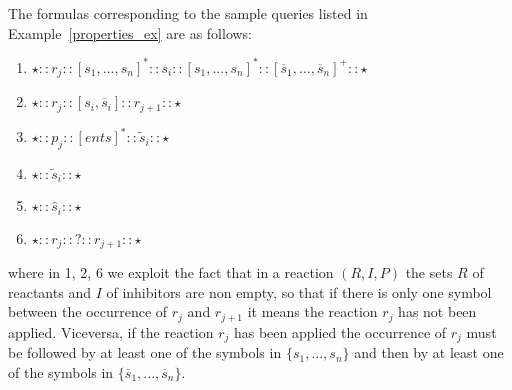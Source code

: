 
The formulas corresponding to the sample queries listed in Example~\ref{properties_ex} are as follows:

\begin{enumerate}
\item
$\star :: r_j :: [ s_1,...,s_n ]^* :: s_i :: [  s_1,...,s_n ]^* :: [  \overline{s}_1,...,\overline{s}_n ]^+ :: \star$
\item
$\star :: r_j :: [s_i, \overline{s}_i] :: r_{j+1} :: \star$
\item
$\star :: p_j :: [  \mathit{ents} ]^* :: \widetilde{s}_i :: \star$
\item
$\star :: \widetilde{s}_i :: \star$
\item
$\star :: \widehat{s}_i :: \star$
\item
$\star :: r_j :: ? :: r_{j+1} :: \star$
\end{enumerate}
where in 1, 2, 6 we exploit the fact that in a reaction $(R,I,P)$ the sets $R$ of reactants and  $I$ of inhibitors are non empty, so that if there is only one symbol between the occurrence of $r_j$ and $r_{j+1}$ it means the reaction $r_j$ has not been applied. Viceversa, if the reaction $r_j$ has been applied the occurrence of $r_j$ must be followed by at least one of the symbols in $\{s_1,...,s_n\}$ and then by at least one of the symbols in $\{\overline{s}_1,...,\overline{s}_n\}$.

